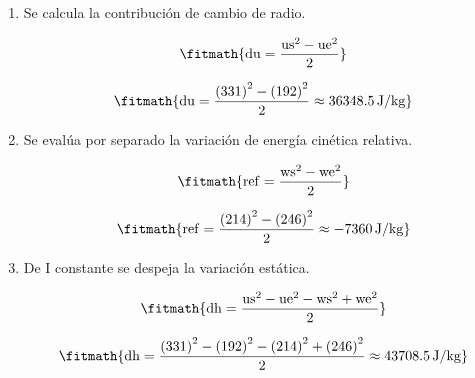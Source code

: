 \begin{enumerate}

\item Se calcula la contribución de cambio de radio.

\[\fitmath{\mathrm{du}=\frac{{\mathrm{us}}^{2}-{\mathrm{ue}}^{2}}{2}}\]

\[\fitmath{\mathrm{du}=\frac{{(331)}^{2}-{(192)}^{2}}{2}\approx 36348.5\,\mathrm{J/kg}}\]

\item Se evalúa por separado la variación de energía cinética relativa.

\[\fitmath{\mathrm{ref}=\frac{{\mathrm{ws}}^{2}-{\mathrm{we}}^{2}}{2}}\]

\[\fitmath{\mathrm{ref}=\frac{{(214)}^{2}-{(246)}^{2}}{2}\approx -7360\,\mathrm{J/kg}}\]

\item De I constante se despeja la variación estática.

\[\fitmath{\mathrm{dh}=\frac{{\mathrm{us}}^{2}-{\mathrm{ue}}^{2}-{\mathrm{ws}}^{2}+{\mathrm{we}}^{2}}{2}}\]

\[\fitmath{\mathrm{dh}=\frac{{(331)}^{2}-{(192)}^{2}-{(214)}^{2}+{(246)}^{2}}{2}\approx 43708.5\,\mathrm{J/kg}}\]

\end{enumerate}
